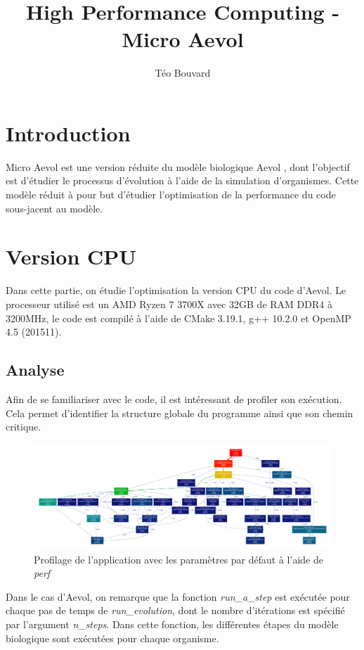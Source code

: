 \documentclass[a4paper, 10pt, twoside]{article}
\begin{document}
\title{High Performance Computing - Micro Aevol}
\author{T\'eo Bouvard}
\maketitle

\section{Introduction}

Micro Aevol est une version réduite du modèle biologique Aevol \cite{aevol}, dont l'objectif est d'étudier le processus d'évolution à l'aide de la simulation d'organismes. Cette modèle réduit à pour but d'étudier l'optimisation de la performance du code sous-jacent au modèle.

\section{Version CPU}

Dans cette partie, on étudie l'optimisation la version CPU du code d'Aevol. Le processeur utilisé est un AMD Ryzen 7 3700X avec 32GB de RAM DDR4 à 3200MHz, le code est compilé à l'aide de CMake 3.19.1, g++ 10.2.0 et OpenMP 4.5 (201511).

\subsection{Analyse}

Afin de se familiariser avec le code, il est intéressant de profiler son exécution. Cela permet d'identifier la structure globale du programme ainsi que son chemin critique.

\begin{figure}[htpb]
	\includegraphics[width=\linewidth]{img/profile_aevol.pdf}
	\caption{Profilage de l'application avec les paramètres par défaut à l'aide de \textit{perf}}
\end{figure}

Dans le cas d'Aevol, on remarque que la fonction \textit{run\_a\_step} est exécutée pour chaque pas de temps de \textit{run\_evolution}, dont le nombre d'itérations est spécifié par l'argument \textit{n\_steps}.
Dans cette fonction, les différentes étapes du modèle biologique sont exécutées pour chaque organisme.
\end{document}

